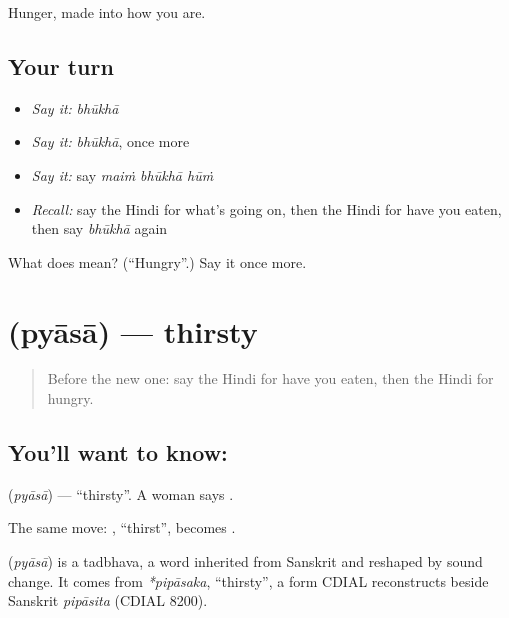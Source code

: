 \begin{grammarlens}[title={What you've built}]
Hunger, made into how you are.
\end{grammarlens}

\subsection*{Your turn}
\begin{itemize}
\raggedright
  \item \emph{Say it:} \emph{bhūkhā}
  \item \emph{Say it:} \emph{bhūkhā}, once more
  \item \emph{Say it:} say \emph{maiṁ bhūkhā hūṁ}
  \item \emph{Recall:} say the Hindi for what's going on, then the Hindi for have you eaten, then say \emph{bhūkhā} again
\end{itemize}

\begin{tcolorbox}[breakable,colback=teal!4,colframe=teal!35!black,title={Before you move on}]
What does  mean? (\textquotedblleft{}Hungry\textquotedblright{}.) Say it once more.
\end{tcolorbox}
\section[\texorpdfstring{\hi{प्यासा} (pyāsā)}{प्यासा (pyāsā)}]{ (pyāsā) — thirsty}

\label{lesson:HI-C124-pyasa}



\begin{quote}
Before the new one: say the Hindi for have you eaten, then the Hindi for hungry.
\end{quote}

\subsection*{You'll want to know: }
\textbf{} (\emph{pyāsā}) — \textquotedblleft{}thirsty\textquotedblright{}. A woman says \textbf{}.

The same move: \textbf{}, \textquotedblleft{}thirst\textquotedblright{}, becomes \textbf{}.

\begin{cousinweb}
\textbf{} (\emph{pyāsā}) is a tadbhava, a word inherited from Sanskrit and reshaped by sound change. It comes from \emph{*pipāsaka}, \textquotedblleft{}thirsty\textquotedblright{}, a form CDIAL reconstructs beside Sanskrit \emph{pipāsita} (CDIAL 8200).
\end{cousinweb}

